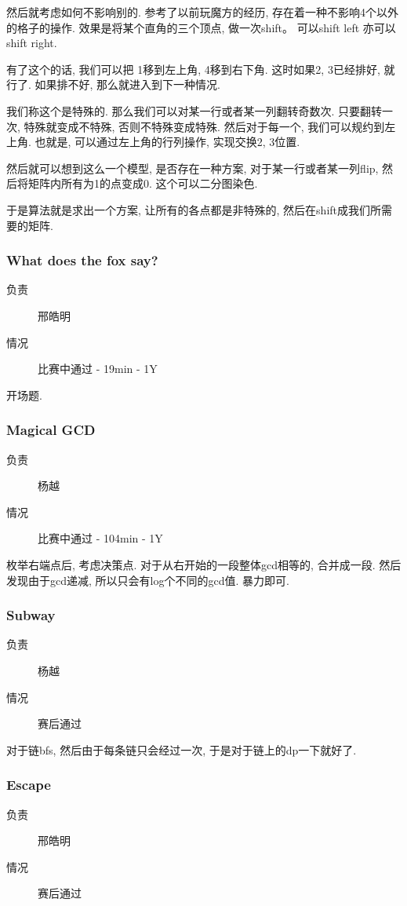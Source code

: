 \documentclass[a4paper, 11pt, nofonts, nocap, fancyhdr]{ctexart}
\newcommand{\problem}[1]{\subsubsection{#1}}
\begin{document}
然后就考虑如何不影响别的. 参考了以前玩魔方的经历, 存在着一种不影响4个以外的格子的操作. 效果是将某个直角的三个顶点, 做一次shift。 可以shift left 亦可以shift right.

有了这个的话, 我们可以把 1移到左上角, 4移到右下角. 这时如果2, 3已经排好, 就行了. 如果排不好, 那么就进入到下一种情况.

我们称这个是特殊的. 那么我们可以对某一行或者某一列翻转奇数次. 只要翻转一次, 特殊就变成不特殊, 否则不特殊变成特殊. 然后对于每一个, 我们可以规约到左上角. 也就是, 可以通过左上角的行列操作, 实现交换2, 3位置.

然后就可以想到这么一个模型, 是否存在一种方案, 对于某一行或者某一列flip, 然后将矩阵内所有为1的点变成0. 这个可以二分图染色.

于是算法就是求出一个方案, 让所有的各点都是非特殊的, 然后在shift成我们所需要的矩阵.

\problem{What does the fox say?}

\begin{description}
\item[负责] 邢皓明
\item[情况] 比赛中通过 - 19min - 1Y 
\end{description}

开场题.

\problem{Magical GCD}

\begin{description}
\item[负责] 杨越
\item[情况] 比赛中通过 - 104min - 1Y
\end{description}

枚举右端点后, 考虑决策点. 对于从右开始的一段整体gcd相等的, 合并成一段. 然后发现由于gcd递减, 所以只会有log个不同的gcd值. 暴力即可.

\problem{Subway}

\begin{description}
\item[负责] 杨越
\item[情况] 赛后通过
\end{description}

对于链bfs, 然后由于每条链只会经过一次, 于是对于链上的dp一下就好了.

\problem{Escape}

\begin{description}
\item[负责] 邢皓明
\item[情况] 赛后通过
\end{description}
\end{document}
